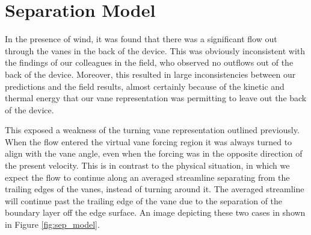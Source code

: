 

\section{Separation Model}
\label{sec:separation}

In the presence of wind, it was found that there was a significant flow
out through the vanes in the back of the device. This was obviously
inconsistent with the findings of our colleagues in the field, who
observed no outflows out of the back of the device. Moreover, this resulted
in large inconsistencies between our predictions and the field results,
almost certainly because of the kinetic and thermal energy that our vane
representation was permitting to leave out the back of the device.  

This exposed a weakness of the turning vane representation outlined
previously. When the flow entered the virtual vane forcing region it was
always turned to align with the vane angle, even when the forcing was in
the opposite direction of the present velocity.
This is in contrast to the physical situation, in which we
expect the flow to continue along an averaged streamline separating from the 
trailing edges of the vanes, instead of turning around it. 
The averaged streamline will continue past the trailing edge of the vane
due to the separation of the boundary layer off the edge surface. An
image depicting these two cases in shown in Figure \ref{fig:sep_model}.  

